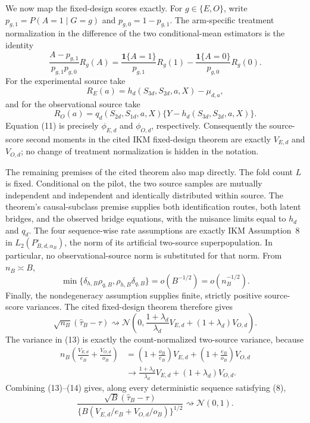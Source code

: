 We now map the fixed-design scores exactly.  For \(g\in\{E,O\}\), write \(p_{g,1}=P(A=1\mid G=g)\) and \(p_{g,0}=1-p_{g,1}\).  The arm-specific treatment normalization in the difference of the two conditional-mean estimators is the identity
\[
 \frac{A-p_{g,1}}{p_{g,1}p_{g,0}}R_g(A)
 =\frac{\mathbf 1\{A=1\}}{p_{g,1}}R_g(1)
  -\frac{\mathbf 1\{A=0\}}{p_{g,0}}R_g(0).                 \tag{11}
\]
For the experimental source take
\[
 R_E(a)=h_d(S_{3d},S_{2d},a,X)-\mu_{d,a},
\]
and for the observational source take
\[
 R_O(a)=q_d(S_{2d},S_{1d},a,X)
 \{Y-h_d(S_{3d},S_{2d},a,X)\}.
\]
Equation (11) is precisely \(\phi_{E,d}\) and \(\phi_{O,d}\), respectively.  Consequently the source-score second moments in the cited IKM fixed-design theorem are exactly \(V_{E,d}\) and \(V_{O,d}\); no change of treatment normalization is hidden in the notation.

The remaining premises of the cited theorem also map directly.  The fold count \(L\) is fixed.  Conditional on the pilot, the two source samples are mutually independent and independent and identically distributed within source.  The theorem's causal-subclass premise supplies both identification routes, both latent bridges, and the observed bridge equations, with the nuisance limits equal to \(h_d\) and \(q_d\).  The four sequence-wise rate assumptions are exactly IKM Assumption~8 in \(L_2(P_{B,d,\alpha_B}^{\circ})\), the norm of its artificial two-source superpopulation.  In particular, no observational-source norm is substituted for that norm.  From \(n_B\asymp B\),
\[
 \min\{\delta_{h,B}\rho_{q,B},\rho_{h,B}\delta_{q,B}\}
 =o(B^{-1/2})=o(n_B^{-1/2}).                                \tag{12}
\]
Finally, the nondegeneracy assumption supplies finite, strictly positive source-score variances.  The cited fixed-design theorem therefore gives
\[
 \sqrt{n_B}(\widehat\tau_B-\tau)
 \rightsquigarrow
 \mathcal N\!\left(0,
 \frac{1+\lambda_d}{\lambda_d}V_{E,d}
 +(1+\lambda_d)V_{O,d}\right).                             \tag{13}
\]
The variance in (13) is exactly the count-normalized two-source variance, because
\[
\begin{aligned}
 n_B\left(\frac{V_{E,d}}{e_B}+\frac{V_{O,d}}{o_B}\right)
 &=\left(1+\frac{o_B}{e_B}\right)V_{E,d}
   +\left(1+\frac{e_B}{o_B}\right)V_{O,d}\\
 &\longrightarrow
 \frac{1+\lambda_d}{\lambda_d}V_{E,d}
 +(1+\lambda_d)V_{O,d}.                                    
\end{aligned}                                                \tag{14}
\]
Combining (13)--(14) gives, along every deterministic sequence satisfying (8),
\[
 \frac{\sqrt B(\widehat\tau_B-\tau)}
 {\{B(V_{E,d}/e_B+V_{O,d}/o_B)\}^{1/2}}
 \rightsquigarrow\mathcal N(0,1).                          \tag{15}
\]


